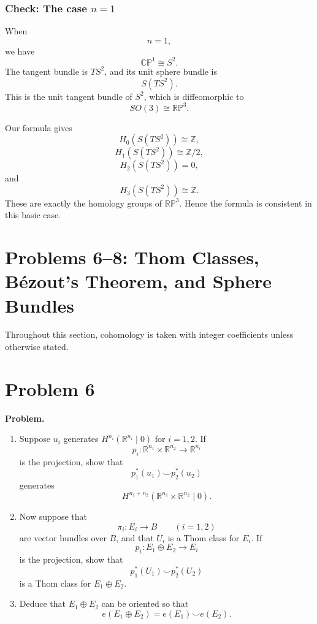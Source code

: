 \documentclass[12pt,a4paper]{article}
\theoremstyle{notespace}
\begin{document}
\subsubsection*{Check: The case \(n=1\)}

When
\[
n=1,
\]
we have
\[
\mathbb{CP}^1\cong S^2.
\]
The tangent bundle is \(TS^2\), and its unit sphere bundle is
\[
S(TS^2).
\]
This is the unit tangent bundle of \(S^2\), which is diffeomorphic to
\[
SO(3)\cong \mathbb{RP}^3.
\]

Our formula gives
\[
H_0(S(TS^2))\cong \mathbb Z,
\]
\[
H_1(S(TS^2))\cong \mathbb Z/2,
\]
\[
H_2(S(TS^2))=0,
\]
and
\[
H_3(S(TS^2))\cong \mathbb Z.
\]
These are exactly the homology groups of \(\mathbb{RP}^3\). Hence the formula is
consistent in this basic case.


\section{Problems 6--8: Thom Classes, B\'ezout's Theorem, and Sphere Bundles}

Throughout this section, cohomology is taken with integer coefficients unless
otherwise stated.

\section{Problem 6}

\textbf{Problem.}
\begin{enumerate}
	\item[(a)] Suppose \(u_i\) generates \(H^{n_i}(\mathbb R^{n_i}\mid 0)\) for
	\(i=1,2\). If
	\[
	p_i:\mathbb R^{n_1}\times \mathbb R^{n_2}\longrightarrow \mathbb R^{n_i}
	\]
	is the projection, show that
	\[
	p_1^*(u_1)\smile p_2^*(u_2)
	\]
	generates
	\[
	H^{n_1+n_2}(\mathbb R^{n_1}\times \mathbb R^{n_2}\mid 0).
	\]
	
	\item[(b)] Now suppose that
	\[
	\pi_i:E_i\to B
	\qquad (i=1,2)
	\]
	are vector bundles over \(B\), and that \(U_i\) is a Thom class for \(E_i\).
	If
	\[
	p_i:E_1\oplus E_2\to E_i
	\]
	is the projection, show that
	\[
	p_1^*(U_1)\smile p_2^*(U_2)
	\]
	is a Thom class for \(E_1\oplus E_2\).
	
	\item[(c)] Deduce that \(E_1\oplus E_2\) can be oriented so that
	\[
	e(E_1\oplus E_2)=e(E_1)\smile e(E_2).
	\]
\end{enumerate}

\medskip
\end{document}

